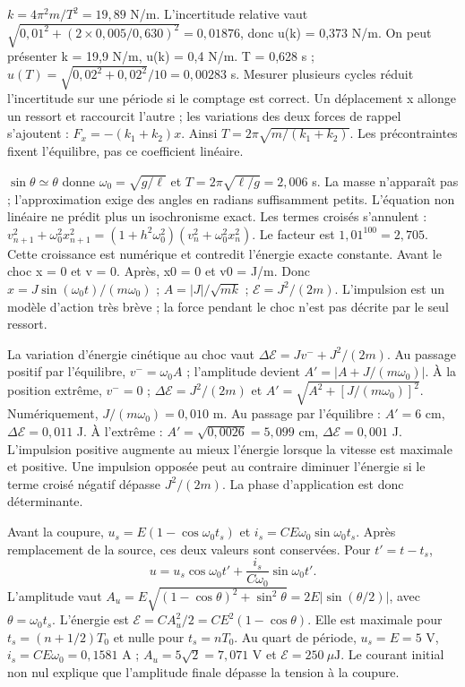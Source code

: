 $k=4\pi^2m/T^2=19{,}89$ N/m. L’incertitude relative vaut $\sqrt{0{,}01^2+(2\times0{,}005/0{,}630)^2}=0{,}01876$, donc u(k) = 0,373 N/m. On peut présenter k = 19,9 N/m, u(k) = 0,4 N/m.
T = 0,628 s ; $u(T)=\sqrt{0{,}02^2+0{,}02^2}/10=0{,}00283$ s. Mesurer plusieurs cycles réduit l’incertitude sur une période si le comptage est correct.
Un déplacement x allonge un ressort et raccourcit l’autre ; les variations des deux forces de rappel s’ajoutent : $F_x=-(k_1+k_2)x$. Ainsi $T=2\pi\sqrt{m/(k_1+k_2)}$. Les précontraintes fixent l’équilibre, pas ce coefficient linéaire.


$\sin\theta\simeq\theta$ donne $\omega_0=\sqrt{g/\ell}$ et $T=2\pi\sqrt{\ell/g}=2{,}006$ s. La masse n’apparaît pas ; l’approximation exige des angles en radians suffisamment petits. L’équation non linéaire ne prédit plus un isochronisme exact.
Les termes croisés s’annulent : $v_{n+1}^2+\omega_0^2x_{n+1}^2=(1+h^2\omega_0^2)(v_n^2+\omega_0^2x_n^2)$. Le facteur est $1{,}01^{100}=2{,}705$. Cette croissance est numérique et contredit l’énergie exacte constante.
Avant le choc x = 0 et v = 0. Après, x0 = 0 et v0 = J/m. Donc $x=J\sin(\omega_0t)/(m\omega_0)$ ; $A=|J|/\sqrt{mk}$ ; $\mathcal E=J^2/(2m)$. L’impulsion est un modèle d’action très brève ; la force pendant le choc n’est pas décrite par le seul ressort.


La variation d’énergie cinétique au choc vaut $\Delta\mathcal E=Jv^-+J^2/(2m)$. Au passage positif par l’équilibre, $v^-=\omega_0A$ ; l’amplitude devient $A'=|A+J/(m\omega_0)|$.
À la position extrême, $v^-=0$ ; $\Delta\mathcal E=J^2/(2m)$ et $A'=\sqrt{A^2+[J/(m\omega_0)]^2}$.
Numériquement, $J/(m\omega_0)=0{,}010$ m. Au passage par l’équilibre : $A'=6$ cm, $\Delta\mathcal E=0{,}011$ J. À l’extrême : $A'=\sqrt{0{,}0026}=5{,}099$ cm, $\Delta\mathcal E=0{,}001$ J.
L’impulsion positive augmente au mieux l’énergie lorsque la vitesse est maximale et positive. Une impulsion opposée peut au contraire diminuer l’énergie si le terme croisé négatif dépasse $J^2/(2m)$. La phase d’application est donc déterminante.


Avant la coupure, $u_s=E(1-\cos\omega_0t_s)$ et $i_s=CE\omega_0\sin\omega_0t_s$. Après remplacement de la source, ces deux valeurs sont conservées. Pour $t'=t-t_s$,
\[u=u_s\cos\omega_0t'+\frac{i_s}{C\omega_0}\sin\omega_0t'.\]
L’amplitude vaut $A_u=E\sqrt{(1-\cos\theta)^2+\sin^2\theta}=2E|\sin(\theta/2)|$, avec $\theta=\omega_0t_s$. L’énergie est $\mathcal E=CA_u^2/2=CE^2(1-\cos\theta)$.
Elle est maximale pour $t_s=(n+1/2)T_0$ et nulle pour $t_s=nT_0$. Au quart de période, $u_s=E=5$ V, $i_s=CE\omega_0=0{,}1581$ A ; $A_u=5\sqrt2=7{,}071$ V et $\mathcal E=250\ \mu\mathrm{ J}$. Le courant initial non nul explique que l’amplitude finale dépasse la tension à la coupure.



